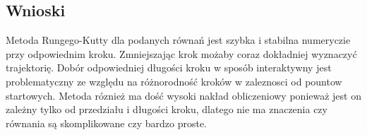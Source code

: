 \documentclass[a4paper, 11pt]{article}
\begin{document}
%
%
%
%
%
%
%
%

\subsection{Wnioski}
Metoda Rungego-Kutty dla podanych równań jest szybka i stabilna numeryczie przy odpowiednim kroku. Zmniejszając krok możaby coraz dokładniej wyznaczyć trajektorię. Dobór odpowiedniej długości kroku w sposób interaktywny jest problematyczny ze względu na różnorodność kroków w zaleznosci od pountow startowych. Metoda róznież ma dość wysoki nakład obliczeniowy ponieważ jest on zależny tylko od przedziału i długości kroku, dlatego nie ma znaczenia czy równania są skomplikowane czy bardzo proste. 
\end{document}
